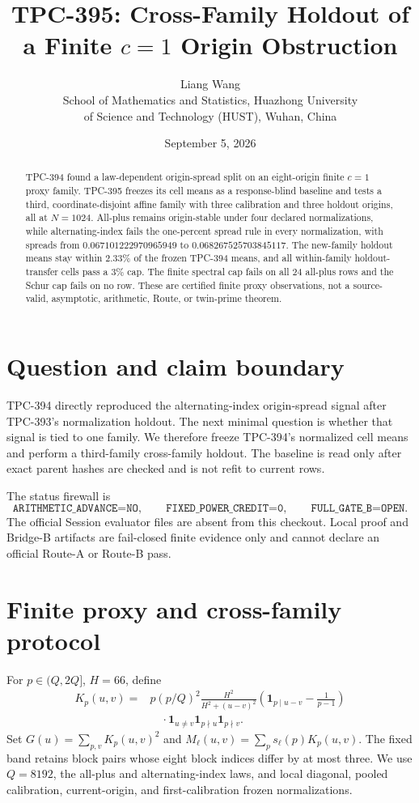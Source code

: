 \documentclass[10pt]{article}
\title{TPC-395: Cross-Family Holdout of a Finite $c=1$ Origin Obstruction}
\author{Liang Wang\\
School of Mathematics and Statistics, Huazhong University\\
of Science and Technology (HUST), Wuhan, China}
\date{September 5, 2026}
\begin{document}
\maketitle

\begin{abstract}
TPC-394 found a law-dependent origin-spread split on an eight-origin finite
$c=1$ proxy family.  TPC-395 freezes its cell means as a response-blind
baseline and tests a third, coordinate-disjoint affine family with three
calibration and three holdout origins, all at $N=1024$.  All-plus remains
origin-stable under four declared normalizations, while alternating-index
fails the one-percent spread rule in every normalization, with spreads from
$0.067101222970965949$ to $0.068267525703845117$.  The new-family holdout
means stay within $2.33\%$ of the frozen TPC-394 means, and all within-family
holdout-transfer cells pass a $3\%$ cap.  The finite spectral cap fails on all
24 all-plus rows and the Schur cap fails on no row.  These are certified finite
proxy observations, not a source-valid, asymptotic, arithmetic, Route, or
twin-prime theorem.
\end{abstract}

\section{Question and claim boundary}

TPC-394 directly reproduced the alternating-index origin-spread signal after
TPC-393's normalization holdout.  The next minimal question is whether that
signal is tied to one family.  We therefore freeze TPC-394's normalized cell
means and perform a third-family cross-family holdout.  The baseline is read
only after exact parent hashes are checked and is not refit to current rows.

The status firewall is
\[
 \texttt{ARITHMETIC\_ADVANCE=NO},\qquad
 \texttt{FIXED\_POWER\_CREDIT=0},\qquad
 \texttt{FULL\_GATE\_B=OPEN}.
\]
The official Session evaluator files are absent from this checkout.  Local
proof and Bridge-B artifacts are fail-closed finite evidence only and cannot
declare an official Route-A or Route-B pass.

\section{Finite proxy and cross-family protocol}

For $p\in(Q,2Q]$, $H=66$, define
\begin{align*}
 K_p(u,v)={}&p(p/Q)^2\frac{H^2}{H^2+(u-v)^2}
 \left(\mathbf 1_{p\mid u-v}-\frac{1}{p-1}\right)\\
 &\quad\cdot\mathbf 1_{u\ne v}\mathbf 1_{p\nmid u}\mathbf 1_{p\nmid v}.
\end{align*}
Set $G(u)=\sum_{p,v}K_p(u,v)^2$ and
$M_\ell(u,v)=\sum_p s_\ell(p)K_p(u,v)$.  The fixed band retains block pairs
whose eight block indices differ by at most three.  We use $Q=8192$, the
all-plus and alternating-index laws, and local diagonal, pooled calibration,
current-origin, and first-calibration frozen normalizations.
\end{document}
